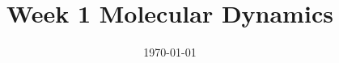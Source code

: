 %
% 
% 
%






\renewcommand{\PersonTitel}{}
\newcommand{\Datum}{\today}

\usepackage{tikz}
\usetikzlibrary{decorations.pathreplacing}
\usetikzlibrary{angles, quotes}
\usetikzlibrary{shapes,arrows, positioning, calc} 
\usepackage{amssymb}

\usepackage{fancyvrb}

\usepackage{blindtext}
\usepackage{listings}

\newlength\myindent
\setlength\myindent{2em}

\renewcommand{\PraesentationFusszeileZusatz}{}%

\title{Week 1 Molecular Dynamics}
\author{\PersonVornameAl{} \PersonNachnameHo{} \and
	\PersonVornameJa{} \PersonNachnameHa{} \and
	\PersonVornameJo{} \PersonNachnameRi{} }
\institute[]{\UniversitaetName \\ \FakultaetName \\ \LehrstuhlName}
\date[\Datum]{\today}%
\subject{Thema der Präsentation}



